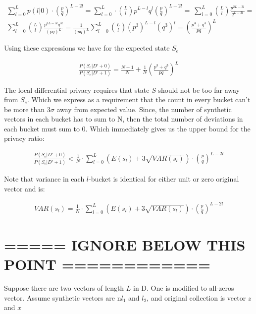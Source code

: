 \documentclass[11pt,draft]{article}
\begin{document}
\begin{align}
\sum_{l=0}^{L} p(l|0)  \cdot  \left ( \frac{p}{q} \right )^ {L - 2l} = \sum_{l=0}^{L}  \cdot   \binom{L}{l} p^{L-l}q^l \left ( \frac{p}{q} \right )^ {L - 2l} = \
\sum_{l=0}^{L}  \binom{L}{l}   \frac{p^{2L-3l}}{q^{L-3l}} = \\
\sum_{l=0}^{L}  \binom{L}{l}   \frac{p^{3L-3l} q^{3l}}{(pq)^{L}} = \frac{1}{(pq)^{L}} \sum_{l=0}^{L}  \binom{L}{l}   (p^3)^{L-l} (q^3)^{l} = \left ( \frac{p^3 + q^3}{pq} \right )^L
\end{align}

Using these expressions we have for the expected state $S_e$

\begin{align}
\frac{P(S_e|D'+0)}{P(S_e|D'+1)} = \frac{N-1}{N} + \frac{1}{N}  \left ( \frac{p^3 + q^3}{pq} \right )^L
\end{align}

The local differential privacy requires that state $S$ should not be too far away from $S_e$.  Which we express as a requirement that the count in every bucket can't be more than $3\sigma$ away from expected value.  Since, the number of synthetic vectors in each bucket has to sum to N, then the total number of deviations in each bucket must sum to 0. Which immediately gives us the upper bound for the privacy ratio:

\begin{align}
\frac{P(S_e|D'+0)}{P(S_e|D'+1)} <   \frac{1}{N}   \cdot  \sum_{l=0}^{L} (E(s_l) + 3\sqrt{VAR(s_l)}) \cdot  \left ( \frac{p}{q} \right )^ {L - 2l}
\end{align}

Note that variance in each $l$-bucket is identical for either unit or zero original vector and is:

\begin{align}
VAR(s_l) =  \frac{1}{N}   \cdot  \sum_{l=0}^{L} (E(s_l) + 3\sqrt{VAR(s_l)}) \cdot  \left ( \frac{p}{q} \right )^ {L - 2l}
\end{align}

\newpage 


\section{===== IGNORE BELOW THIS POINT  ============}

Suppose there are two vectors of length $L$ in D.  One is modified to all-zeros vector.  
Assume synthetic vectors are n$l_1$ and $l_2$, and original collection is vector $z$ and $x$
\end{document}
